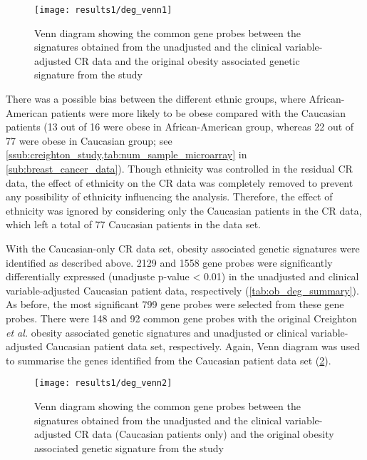\begin{figure}[htpb]
	\centering
	\texttt{[image: results1/deg\_venn1]}
	\caption[Venn diagram of the \glspl{deg} identified from the CR data (all patients included)]{Venn diagram showing the common gene probes between the signatures obtained from the unadjusted and the clinical variable-adjusted CR data and the original obesity associated genetic signature from the \citet{Creighton2012} study }
	\label{fig:venn1}
\end{figure}

\noindent
There was a possible bias between the different ethnic groups, where African-American patients were more likely to be obese compared with the Caucasian patients (13 out of 16 were obese in African-American group, whereas 22 out of 77 were obese in Caucasian group; see \cref{ssub:creighton_study,tab:num_sample_microarray} in \cref{sub:breast_cancer_data}).
Though ethnicity was controlled in the residual CR data, the effect of ethnicity on the CR data was completely removed to prevent any possibility of ethnicity influencing the analysis.
Therefore, the effect of ethnicity was ignored by considering only the Caucasian patients in the CR data, which left a total of 77 Caucasian patients in the data set.

With the Caucasian-only CR data set, obesity associated genetic signatures were identified as described above.
2129 and 1558 gene probes were significantly differentially expressed (unadjuste p-value \textless{} 0.01) in the unadjusted and clinical variable-adjusted Caucasian patient data, respectively (\cref{tab:ob_deg_summary}).
As before, the most significant 799 gene probes were selected from these gene probes.
There were 148 and 92 common gene probes with the original Creighton \textit{et al.} obesity associated genetic signatures and unadjusted or clinical variable-adjusted Caucasian patient data set, respectively.
Again, Venn diagram was used to summarise the genes identified from the Caucasian patient data set (\cref{fig:venn2}).

\begin{figure}[tb]
	\centering
	\texttt{[image: results1/deg\_venn2]}
	\caption[Venn diagram of the \glspl{deg} identified from the CR data (Caucasian patients only)]{Venn diagram showing the common gene probes between the signatures obtained from the unadjusted and the clinical variable-adjusted CR data (Caucasian patients only) and the original obesity associated genetic signature from the \citet{Creighton2012} study}
	\label{fig:venn2}
\end{figure}

